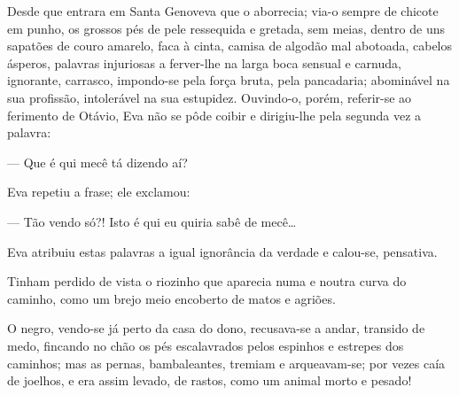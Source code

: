 {Desde que entrara em Santa Genoveva que o aborrecia; via-o
sempre de chicote em punho, os grossos pés de pele ressequida e
gretada, sem meias, dentro de uns sapatões de couro amarelo, faca à
cinta, camisa de algodão mal abotoada, cabelos ásperos, palavras
injuriosas a ferver-lhe na larga boca sensual e carnuda, ignorante,
carrasco, impondo-se pela força bruta, pela pancadaria;
abominável na sua profissão, intolerável na sua estupidez.
Ouvindo-o, porém, referir-se ao ferimento de Otávio,
Eva não se pôde coibir e dirigiu-lhe pela segunda vez a palavra:



--- Que é qui mecê tá dizendo aí?

Eva repetiu a frase; ele exclamou:

--- Tão vendo só?! Isto é qui eu quiria sabê de
mecê\ldots{}

Eva atribuiu estas palavras a igual ignorância da
verdade e calou-se, pensativa.

Tinham perdido de vista o riozinho que aparecia numa e noutra
curva do caminho, como um brejo meio encoberto de matos e agriões.




O negro, vendo-se já perto da casa do dono, recusava-se a andar,
transido de medo, fincando no chão os pés escalavrados pelos espinhos e
estrepes dos caminhos; mas as pernas, bambaleantes, tremiam e
arqueavam-se; por vezes caía de joelhos, e era assim levado, de rastos,
como um animal morto e pesado!


}
